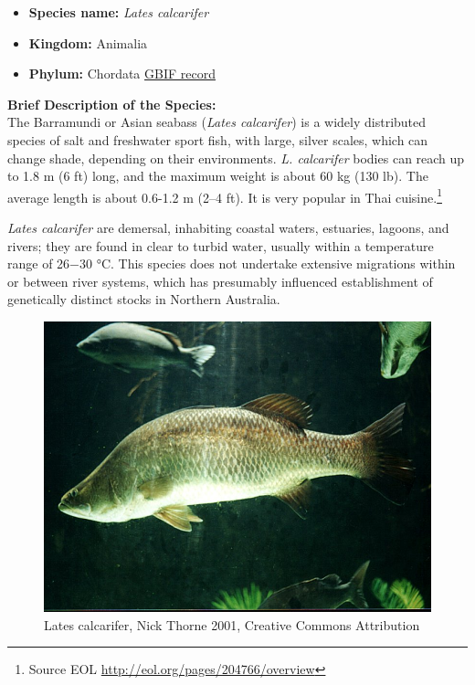 \documentclass[openany]{book}
\providecommand{\tightlist}{%
  \setlength{\itemsep}{0pt}\setlength{\parskip}{0pt}}
\let\rmarkdownfootnote\footnote%
\def\footnote{\protect\rmarkdownfootnote}
\theoremstyle{definition}
\theoremstyle{definition}
\theoremstyle{definition}
\theoremstyle{remark}
\begin{document}
\begin{itemize}
\tightlist
\item
  \textbf{Species name:} \emph{Lates calcarifer}
\item
  \textbf{Kingdom:} Animalia
\item
  \textbf{Phylum:} Chordata
  \href{https://www.gbif.org/species/2223871}{GBIF record}
\end{itemize}

\textbf{Brief Description of the Species:}\\
The Barramundi or Asian seabass (\emph{Lates calcarifer}) is a widely
distributed species of salt and freshwater sport fish, with large,
silver scales, which can change shade, depending on their environments.
\emph{L. calcarifer} bodies can reach up to 1.8 m (6 ft) long, and the
maximum weight is about 60 kg (130 lb). The average length is about
0.6-1.2 m (2--4 ft). It is very popular in Thai cuisine.\footnote{Source
  EOL \url{http://eol.org/pages/204766/overview}}

\emph{Lates calcarifer} are demersal, inhabiting coastal waters,
estuaries, lagoons, and rivers; they are found in clear to turbid water,
usually within a temperature range of 26−30 °C. This species does not
undertake extensive migrations within or between river systems, which
has presumably influenced establishment of genetically distinct stocks
in Northern Australia.

\begin{figure}

{\centering \includegraphics[width=11.11in]{images_species/Barramundi} 

}

\caption{Lates calcarifer, Nick Thorne 2001, Creative Commons Attribution}\label{fig:unnamed-chunk-3}
\end{figure}
\end{document}
